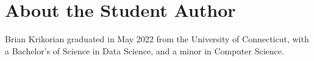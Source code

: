 \documentclass[12pt]{article}
\begin{document}









\section*{About the Student Author}
Brian Krikorian graduated in May 2022 from the University of 
Connecticut, with a Bachelor's of Science in Data Science, and a minor 
in Computer Science.


\end{document}

